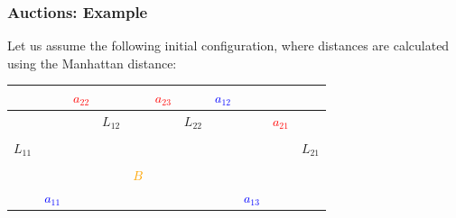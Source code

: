 \begin{frame}
	\frametitle{Auctions: Example}
	
	\large
	
	\vspace{0.5cm}
	
	Let us assume the following initial configuration, where distances are calculated using the 
	Manhattan distance:
	
	\begin{table}[!h]
		\centering
		\setlength\tabcolsep{7pt}
		\def\arraystretch{1.3}
		\begin{tabular}{|c|c|c|c|c|c|c|c|c|c|c|}
			\hline
			&  & \textcolor{red}{$ a_{22} $} & & & \textcolor{red}{$ a_{23} $} &  & \textcolor{blue}{$ a_{12} $} &  &  &  \\ \hline
			
			&  &  & $ L_{12} $ &  &  & $ L_{22} $ &  & & \textcolor{red}{$ a_{21} $} & \\ \hline
			
			&  &  &  &  &  &  &  &  &  & \\ \hline
			
			$ L_{11} $ &  &  &  &  &  &  &  &  &  & $ L_{21} $ \\ \hline
			
			&  &  &  &  &  &  &  &  &  & \\ \hline
			
			&  &  &  & \textcolor{orange}{$ B $} &  &  &  &  & &  \\ \hline
			
			& \textcolor{blue}{$ a_{11} $} &  &  &  &  &  &  & \textcolor{blue}{$ a_{13} $} &  & \\ \hline
		\end{tabular}
	\end{table}
\end{frame}

